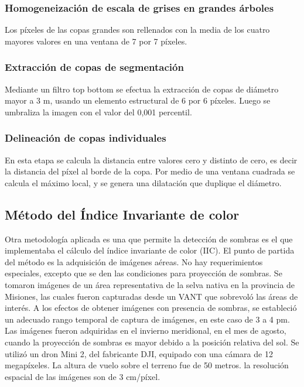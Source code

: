 \subsubsection{Homogeneización de escala de grises en grandes árboles}
Los píxeles de las copas grandes son rellenados con la media de los cuatro mayores valores en una ventana de 7 por 7 píxeles.
\subsubsection{Extracción de copas de segmentación}
Mediante un filtro top bottom se efectua la extracción de copas de diámetro mayor a 3 m, usando un elemento estructural de 6 por 6 píxeles. Luego se umbraliza la imagen con el valor del 0,001 percentil.
\subsubsection{Delineación de copas individuales}
En esta etapa se calcula la distancia entre valores cero y distinto de cero, es decir la distancia del píxel al borde de la copa. Por medio de una ventana cuadrada se calcula el máximo local, y se genera una dilatación que duplique el diámetro.





\subsection{Método del Índice Invariante de color} \label{Metodología IIC}
Otra metodología aplicada es una que permite la detección de sombras es el que implementaba el cálculo del índice invariante de color (IIC). 
El punto de partida del método es la adquisición de imágenes aéreas. No hay requerimientos especiales, excepto que se den las condiciones para proyección de sombras. Se tomaron imágenes de un área representativa de la selva nativa en la provincia de Misiones, las cuales fueron capturadas desde un VANT que sobrevoló las áreas de interés. A los efectos de obtener imágenes con presencia de sombras, se estableció un adecuado rango temporal de captura de imágenes, en este caso de 3 a 4 pm. Las imágenes fueron adquiridas en el invierno meridional, en el mes de agosto, cuando la proyección de sombras es mayor debido a la posición relativa del sol. Se utilizó un dron Mini 2, del fabricante DJI, equipado con una cámara de 12 megapíxeles. La altura de vuelo sobre el terreno fue de 50 metros. la resolución espacial de las imágenes son de 3 cm/píxel.

